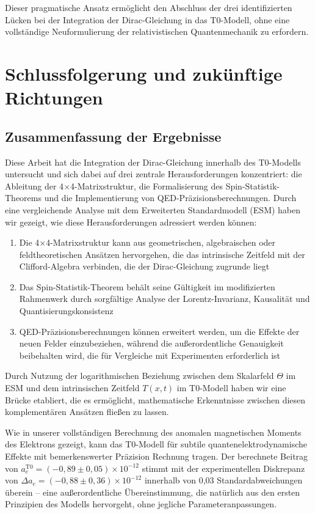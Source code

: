 \documentclass[12pt,a4paper]{article}
\newcommand{\Tfieldt}{T(x,t)}
\begin{document}
	Dieser pragmatische Ansatz ermöglicht den Abschluss der drei identifizierten Lücken bei der Integration der Dirac-Gleichung in das T0-Modell, ohne eine vollständige Neuformulierung der relativistischen Quantenmechanik zu erfordern.
	
	\section{Schlussfolgerung und zukünftige Richtungen}
	\label{sec:conclusion}
	
	\subsection{Zusammenfassung der Ergebnisse}
	\label{subsec:summary}
	
	Diese Arbeit hat die Integration der Dirac-Gleichung innerhalb des T0-Modells untersucht und sich dabei auf drei zentrale Herausforderungen konzentriert: die Ableitung der 4$\times$4-Matrix\-struktur, die Formalisierung des Spin-Statistik-Theorems und die Implementierung von QED-Präzisions\-berechnungen. Durch eine vergleichende Analyse mit dem Erweiterten Standardmodell (ESM) haben wir gezeigt, wie diese Herausforderungen adressiert werden können:
	
	\begin{enumerate}
		\item Die 4$\times$4-Matrix\-struktur kann aus geometrischen, algebraischen oder feldtheoretischen Ansätzen hervorgehen, die das intrinsische Zeitfeld mit der Clifford-Algebra verbinden, die der Dirac-Gleichung zugrunde liegt
		\item Das Spin-Statistik-Theorem behält seine Gültigkeit im modifizierten Rahmenwerk durch sorgfältige Analyse der Lorentz-Invarianz, Kausalität und Quantisierungskonsistenz
		\item QED-Präzisions\-berechnungen können erweitert werden, um die Effekte der neuen Felder einzubeziehen, während die außerordentliche Genauigkeit beibehalten wird, die für Vergleiche mit Experimenten erforderlich ist
	\end{enumerate}
	
	Durch Nutzung der logarithmischen Beziehung zwischen dem Skalarfeld $\Theta$ im ESM und dem intrinsischen Zeitfeld $\Tfieldt$ im T0-Modell haben wir eine Brücke etabliert, die es ermöglicht, mathematische Erkenntnisse zwischen diesen komplementären Ansätzen fließen zu lassen.
	
	Wie in unserer vollständigen Berechnung des anomalen magnetischen Moments des Elektrons gezeigt, kann das T0-Modell für subtile quantenelektrodynamische Effekte mit bemerkenswerter Präzision Rechnung tragen. Der berechnete Beitrag von $a_e^{\text{T0}} = (-0,89 \pm 0,05) \times 10^{-12}$ stimmt mit der experimentellen Diskrepanz von $\Delta a_e = (-0,88 \pm 0,36) \times 10^{-12}$ innerhalb von 0,03 Standardabweichungen überein – eine außerordentliche Übereinstimmung, die natürlich aus den ersten Prinzipien des Modells hervorgeht, ohne jegliche Parameteranpassungen.
	
\end{document}
